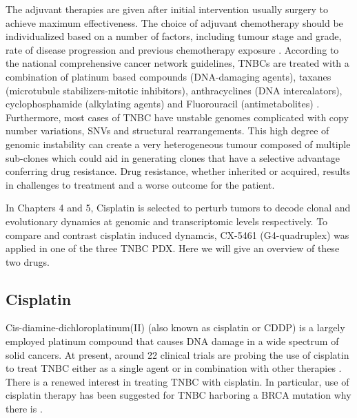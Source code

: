 The adjuvant therapies are given after initial intervention usually surgery to achieve maximum effectiveness. The choice of adjuvant chemotherapy should be individualized based on a number of factors, including tumour stage and grade, rate of disease progression and previous chemotherapy exposure \cite{cardoso20173rd,partridge2014chemotherapy}. According to the national comprehensive cancer network guidelines, TNBCs are treated with a combination of platinum based compounds (DNA-damaging agents), taxanes (microtubule stabilizers-mitotic inhibitors), anthracyclines (DNA intercalators), cyclophosphamide (alkylating agents) and Fluorouracil (antimetabolites) \cite{daly2020nccn}.
Furthermore, most cases of TNBC have unstable genomes complicated with copy number variations, SNVs and structural rearrangements. This high degree of genomic instability can create a very heterogeneous tumour composed of multiple sub-clones which could aid in generating clones that have a selective advantage conferring drug resistance. Drug resistance, whether inherited or acquired, results in challenges to treatment and a worse outcome for the patient.

In Chapters 4 and 5, Cisplatin is selected to perturb tumors to decode clonal and evolutionary dynamics at genomic and transcriptomic levels respectively. To compare and contrast cisplatin induced dynamcis, CX-5461 (G4-quadruplex) was applied in one of the three TNBC PDX. Here we will give an overview of these two drugs.


\subsection{Cisplatin}
Cis-diamine-dichloroplatinum(II) (also known as cisplatin or CDDP) is a largely employed platinum compound that causes DNA damage in  a wide spectrum of solid cancers.  At present, around 22 clinical trials are probing the use of cisplatin to treat TNBC either as a single agent or in combination with other therapies \cite{us2017clinicaltrials}.
There is a renewed interest in treating TNBC with cisplatin.
In particular, use of cisplatin therapy has been suggested for TNBC harboring a BRCA mutation why there is \cite{caparica2019treat,petrelli2016platinum}. 


